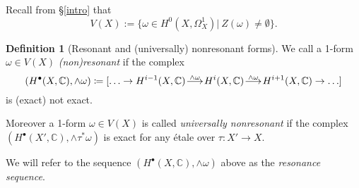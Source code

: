 \documentclass[a4paper,12pt,reqno]{amsart}
\makeatletter
\theoremstyle{plain}
\theoremstyle{definition}
\newtheorem{definition}[theorem]{Definition}
\theoremstyle{remark}
\newcommand{\C}{\mathbb C}
\renewcommand{\longrightarrow}{\xymatrix@1@=15pt{\ar[r]&}}
\newcommand{\bbC}{\mathbb{C}}
\makeatother
\begin{document}
Recall from \S \ref{intro} that \[V(X):=\{ \omega\in H^0(X, \Omega_X^1) |\ Z(\omega)\neq \emptyset\}.\]

\begin{definition}[Resonant and (universally) nonresonant forms]\label{def:resonance}
We call a 1-form $\omega\in V(X)$ \emph{(non)resonant} if the complex 
\[(H^{\bullet}(X,\bbC), \wedge\omega)\coloneqq [\ldots\to H^{i-1}(X,\C)\overset{\wedge\omega}{\longrightarrow}H^{i}(X,\C)\overset{\wedge\omega}{\longrightarrow}H^{i+1}(X,\C)\to\ldots]\]
 is (exact) not exact. 

Moreover a 1-form $\omega\in V(X)$ is called \emph{universally nonresonant} if the complex
\newline $(H^{\bullet}(X',\bbC), \wedge\tau^*\omega)$
 is exact for any \'etale over $\tau\colon X'\to X$. 

We will refer to the sequence $(H^{\bullet}(X,\bbC), \wedge\omega)$ above as the \emph{resonance sequence}.
\end{definition}
\end{document}
